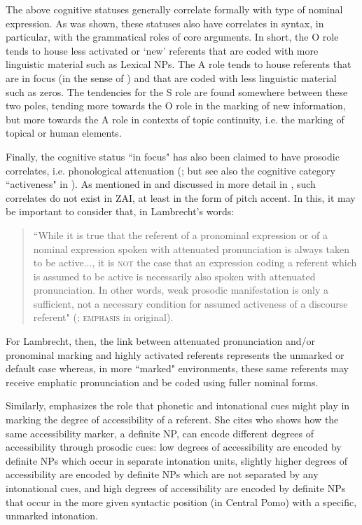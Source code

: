 The above cognitive statuses generally correlate formally with type of nominal expression. As was shown, these statuses also have correlates in syntax, in particular, with the grammatical roles of core arguments. In short, the O role tends to house less activated or `new' referents that are coded with more linguistic material such as Lexical NPs. The A role tends to house referents that are in focus (in the sense of \citet{gundel1993}) and that are coded with less linguistic material such as zeros. The tendencies for the S role are found somewhere between these two poles, tending more towards the O role in the marking of new information, but more towards the A role in contexts of topic continuity, i.e. the marking of topical or human elements. 

Finally, the cognitive status ``in focus" has also been claimed to have prosodic correlates, i.e. phonological attenuation (\citealt[285]{gundel1993}; but see also the cognitive category ``activeness" in \citealt{lambrecht1994,ariel1990,ariel2001}). As mentioned in  and discussed in more detail in , such correlates do not exist in ZAI, at least in the form of pitch accent. In this, it may be important to consider that, in Lambrecht's words:

\begin{quote} ``While it is true that the referent of a pronominal expression or of a nominal expression spoken with attenuated pronunciation is always taken to be active..., it is \textsc{not} the case that an expression coding a referent which is assumed to be active is necessarily also spoken with attenuated pronunciation. In other words, weak prosodic manifestation is only a sufficient, not a necessary condition for assumed activeness of a discourse referent" (\citet[97]{lambrecht1994}; \textsc{emphasis} in original).
\end{quote}
 
For Lambrecht, then, the link between attenuated pronunciation and/or pronominal marking and highly activated referents represents the unmarked or default case whereas, in more ``marked" environments, these same referents may receive emphatic pronunciation and be coded using fuller nominal forms.

Similarly, \citet[50]{ariel2001} emphasizes the role that phonetic and intonational cues might play in marking the degree of accessibility of a referent. She cites \citet{mithun1995} who shows how the same accessibility marker, a definite NP, can encode different degrees of accessibility through prosodic cues: low degrees of accessibility are encoded by definite NPs which occur in separate intonation units, slightly higher degrees of accessibility are encoded by definite NPs which are not separated by any intonational cues, and high degrees of accessibility are encoded by definite NPs that occur in the more given syntactic position (in Central Pomo) with a specific, unmarked intonation. 


